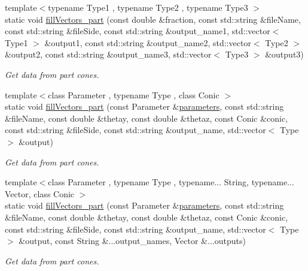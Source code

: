 \begin{DoxyCompactItemize}
{\footnotesize template$<$typename Type1 , typename Type2 , typename Type3 $>$ }\\static void \hyperlink{classTReadHDF5_aeeeacbe514c5f1db0724bb2a6c7a37e1}{fill\-Vectors\-\_\-part} (const double \&fraction, const std\-::string \&file\-Name, const std\-::string \&file\-Side, const std\-::string \&output\-\_\-name1, std\-::vector$<$ Type1 $>$ \&output1, const std\-::string \&output\-\_\-name2, std\-::vector$<$ Type2 $>$ \&output2, const std\-::string \&output\-\_\-name3, std\-::vector$<$ Type3 $>$ \&output3)
\begin{DoxyCompactList}\small\item\em Get data from part cones. \end{DoxyCompactList}\item 
{\footnotesize template$<$class Parameter , typename Type , class Conic $>$ }\\static void \hyperlink{classTReadHDF5_a81db1912ea74ca10c4400c0505a98a2e}{fill\-Vectors\-\_\-part} (const Parameter \&\hyperlink{rays_8h_ae1bc8b0b8c8b9f8e4cc61a5cc7c4ce9e}{parameters}, const std\-::string \&file\-Name, const double \&thetay, const double \&thetaz, const Conic \&conic, const std\-::string \&file\-Side, const std\-::string \&output\-\_\-name, std\-::vector$<$ Type $>$ \&output)
\begin{DoxyCompactList}\small\item\em Get data from part cones. \end{DoxyCompactList}\item 
{\footnotesize template$<$class Parameter , typename Type , typename... String, typename... Vector, class Conic $>$ }\\static void \hyperlink{classTReadHDF5_ac516e016bb822591f18b7f1843c16e51}{fill\-Vectors\-\_\-part} (const Parameter \&\hyperlink{rays_8h_ae1bc8b0b8c8b9f8e4cc61a5cc7c4ce9e}{parameters}, const std\-::string \&file\-Name, const double \&thetay, const double \&thetaz, const Conic \&conic, const std\-::string \&file\-Side, const std\-::string \&output\-\_\-name, std\-::vector$<$ Type $>$ \&output, const String \&...output\-\_\-names, Vector \&...outputs)
\begin{DoxyCompactList}\small\item\em Get data from part cones. \end{DoxyCompactList}\end{DoxyCompactItemize}


